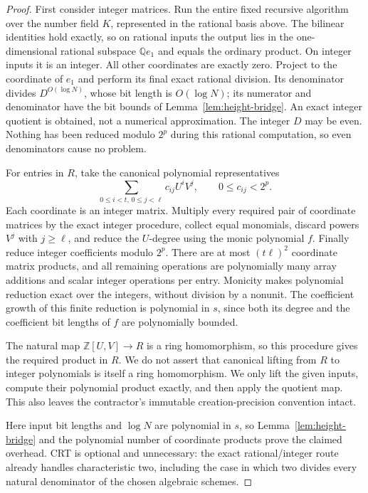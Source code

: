 \begin{proof}
First consider integer matrices. Run the entire fixed recursive algorithm
over the number field $K$, represented in the rational basis above.
The bilinear identities hold exactly, so on rational inputs the output
lies in the one-dimensional rational subspace $\mathbb Q e_1$ and equals
the ordinary product. On integer inputs it is an integer. All other
coordinates are exactly zero. Project to the coordinate of $e_1$ and
perform its final exact rational division. Its denominator divides
$D^{O(\log N)}$, whose bit length is $O(\log N)$; its numerator and
denominator have the bit bounds of Lemma~\ref{lem:height-bridge}.
An exact integer quotient is obtained, not a numerical approximation.
The integer $D$ may be even. Nothing has been reduced modulo $2^p$
during this rational computation, so even denominators cause no problem.

For entries in $R$, take the canonical polynomial representatives
\[
 \sum_{0\leq i<t,\,0\leq j<\ell} c_{ij}U^iV^j,
 \qquad 0\leq c_{ij}<2^p.
\]
Each coordinate is an integer matrix. Multiply every required pair of
coordinate matrices by the exact integer procedure, collect equal
monomials, discard powers $V^j$ with $j\geq\ell$, and reduce the
$U$-degree using the monic polynomial $f$. Finally reduce integer
coefficients modulo $2^p$.
There are at most $(t\ell)^2$ coordinate matrix products, and all
remaining operations are polynomially many array additions and scalar
integer operations per entry. Monicity makes polynomial reduction exact
over the integers, without division by a nonunit. The coefficient growth
of this finite reduction is polynomial in $s$, since both its degree and
the coefficient bit lengths of $f$ are polynomially bounded.

The natural map $\mathbb Z[U,V]\to R$ is a ring homomorphism, so this
procedure gives the required product in $R$. We do not assert that
canonical lifting from $R$ to integer polynomials is itself a ring
homomorphism. We only lift the given inputs, compute their polynomial
product exactly, and then apply the quotient map. This also leaves the
contractor's immutable creation-precision convention intact.

Here input bit lengths and $\log N$ are polynomial in $s$, so
Lemma~\ref{lem:height-bridge} and the polynomial number of coordinate
products prove the claimed overhead. CRT is optional and unnecessary:
the exact rational/integer route already handles characteristic two,
including the case in which two divides every natural denominator of
the chosen algebraic schemes.
\end{proof}

